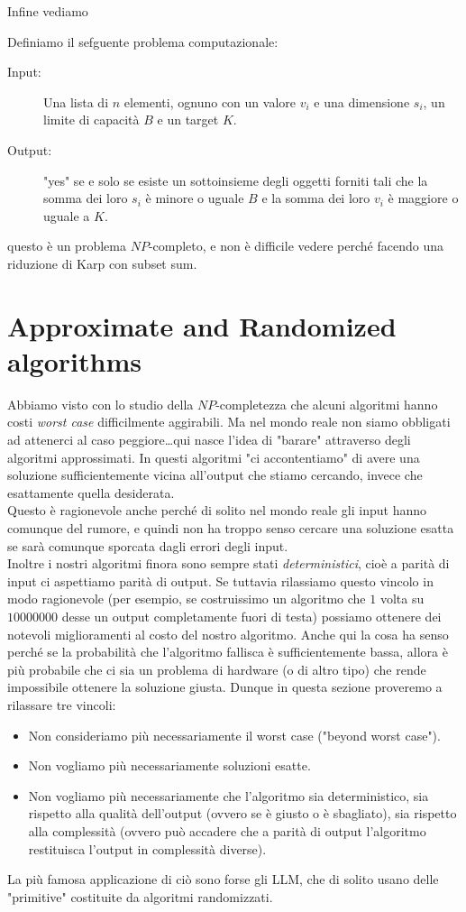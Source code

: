 \documentclass[11pt]{scrartcl}
\begin{document}
	Infine vediamo
	\begin{example}
		Definiamo il sefguente problema computazionale:
		\begin{description}
			\item[Input:] Una lista di $n$ elementi, ognuno con un valore $v_i$ e una dimensione $s_i$, un limite di capacità $B$ e un target $K$.
			\item[Output:] "yes" se e solo se esiste un sottoinsieme degli oggetti forniti tali che la somma dei loro $s_i$ è minore o uguale $B$ e la somma dei loro $v_i$ è maggiore o uguale a $K$.
		\end{description}
	\end{example}
	questo è un problema $NP$-completo, e non è difficile vedere perché facendo una riduzione di Karp con subset sum.
	\newpage
	
	\section{Approximate and Randomized algorithms}
	
	Abbiamo visto con lo studio della $NP$-completezza che alcuni algoritmi hanno costi \textit{worst case} difficilmente aggirabili. Ma nel mondo reale non siamo obbligati ad attenerci al caso peggiore\dots qui nasce l'idea di "barare" attraverso degli algoritmi approssimati. In questi algoritmi "ci accontentiamo" di avere una soluzione sufficientemente vicina all'output che stiamo cercando, invece che esattamente quella desiderata. \\
	Questo è ragionevole anche perché di solito nel mondo reale gli input hanno comunque del rumore, e quindi non ha troppo senso cercare una soluzione esatta se sarà comunque sporcata dagli errori degli input. \\
	Inoltre i nostri algoritmi finora sono sempre stati \textit{deterministici}, cioè a parità di input ci aspettiamo parità di output. Se tuttavia rilassiamo questo vincolo in modo ragionevole (per esempio, se costruissimo un algoritmo che $1$ volta su $10000000$ desse un output completamente fuori di testa) possiamo ottenere dei notevoli miglioramenti al costo del nostro algoritmo. Anche qui la cosa ha senso perché se la probabilità che l'algoritmo fallisca è sufficientemente bassa, allora è più probabile che ci sia un problema di hardware (o di altro tipo) che rende impossibile ottenere la soluzione giusta. Dunque in  questa sezione proveremo a rilassare tre vincoli:
	\begin{itemize}
		\item Non consideriamo più necessariamente il worst case ("beyond worst case").
		\item Non vogliamo più necessariamente soluzioni esatte.
		\item Non vogliamo più necessariamente che l'algoritmo sia deterministico, sia rispetto alla qualità dell'output (ovvero se è giusto o è sbagliato), sia rispetto alla complessità (ovvero può accadere che a parità di output l'algoritmo restituisca l'output in complessità diverse).
	\end{itemize}
	La più famosa applicazione di ciò sono forse gli LLM, che di solito usano delle "primitive" costituite da algoritmi randomizzati. 
	
\end{document}

